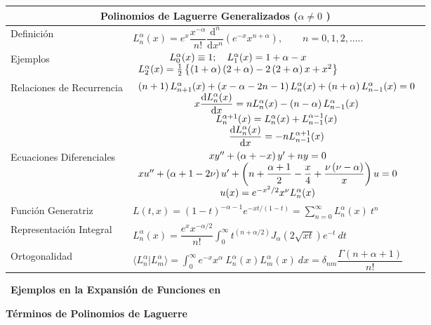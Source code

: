 \documentclass[spanish,notitlepage,letterpaper,12pt]{article}
\begin{document}
\begin{center}
\begin{tabular}
[c]{|l|l|}\hline
\multicolumn{2}{|c|}{Polinomios de Laguerre Generalizados ($\alpha\neq0$%
)}\\\hline
Definici\'{o}n & $L_{n}^{\alpha}(x)=e^{x}\dfrac{x^{-\alpha}}{n!}%
\dfrac{\mathrm{d}^{n}}{\mathrm{d}x^{n}}(e^{-x}x^{n+\alpha}),\qquad
n=0,1,2,.....$\\\hline
Ejemplos & $%
\begin{array}
[c]{c}%
L_{0}^{\alpha}(x)\equiv1;\quad L_{1}^{\alpha}(x)=1+\alpha-x\\
L_{2}^{\alpha}(x)=\frac{1}{2}\left\{  \left(  1+\alpha\right)  \left(
2+\alpha\right)  -2\left(  2+\alpha\right)  x+x^{2}\right\}
\end{array}
$\\\hline
Relaciones de Recurrencia & $%
\begin{array}
[c]{c}%
\left(  n+1\right)  L_{n+1}^{\alpha}(x)+\left(  x-\alpha-2n-1\right)
L_{n}^{\alpha}(x)+\left(  n+\alpha\right)  L_{n-1}^{\alpha}(x)=0\\
x\dfrac{\mathrm{d}L_{n}^{\alpha}(x)}{\mathrm{d}x}=nL_{n}^{\alpha}(x)-\left(
n-\alpha\right)  L_{n-1}^{\alpha}(x)\\
L_{n}^{\alpha+1}(x)=L_{n}^{\alpha}(x)+L_{n-1}^{\alpha-1}(x)\\
\dfrac{\mathrm{d}L_{n}^{\alpha}(x)}{\mathrm{d}x}=-nL_{n-1}^{\alpha+1}(x)
\end{array}
$\\\hline
Ecuaciones Diferenciales & $%
\begin{array}
[c]{c}%
xy^{\prime\prime}+\left(  \alpha+-x\right)  y^{\prime}+ny=0\\
xu^{\prime\prime}+\left(  \alpha+1-2\nu\right)  u^{\prime}+\left(
n+\dfrac{\alpha+1}{2}-\dfrac{x}{4}+\dfrac{\nu\left(  \nu-\alpha\right)  }%
{x}\right)  u=0\\
u(x)=e^{-x^{2}/2}x^{\nu}L_{n}^{\alpha}(x)
\end{array}
$\\\hline
Funci\'{o}n Generatriz & $L(t,x)=\left(  1-t\right)  ^{-\alpha-1}%
e^{-xt/(1-t)}=%
{\displaystyle\sum_{n=0}^{\infty}}
L_{n}^{\alpha}(x)\ t^{n}$\\\hline
Representaci\'{o}n Integral & $L_{n}^{\alpha}(x)=\dfrac{e^{x}x^{-\alpha/2}%
}{n!}%
{\displaystyle\int_{0}^{\infty}}
t^{\left(  n+\alpha/2\right)  }J_{\alpha}\left(  2\sqrt{xt}\right)
e^{-t}\ dt$\\\hline
Ortogonalidad & $\langle L_{n}^{\alpha}|L_{m}^{\alpha}\rangle=%
{\displaystyle\int_{0}^{\infty}}
e^{-x}x^{\alpha}\ L_{n}^{\alpha}(x)L_{m}^{\alpha}(x)\ dx=\delta_{nm}%
\dfrac{\Gamma\left(  n+\alpha+1\right)  }{n!}$\\\hline
\end{tabular}

\newpage\ \textbf{Ejemplos en la Expansi\'{o}n de Funciones en }

\textbf{T\'{e}rminos de Polinomios de Laguerre}
\end{center}
\end{document}
